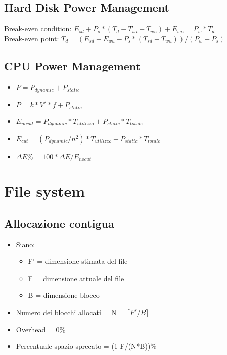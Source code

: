 \documentclass[10pt]{article}
\begin{document}
\subsection*{Hard Disk Power Management}
Break-even condition: $E_{sd}+P_s*(T_d-T_{sd}-T_{wu})+E_{wu}=P_w*T_d$\\
Break-even point: $T_d=(E_{sd}+E_{wu}-P_s*(T_{sd}+T_{wu}))/(P_w-P_s)$
\subsection*{CPU Power Management}
\begin{itemize}
    \item $P=P_{dynamic}+P_{static}$
    \item $P=k*V^2*f+P_{static}$
    \item $E_{nocut}=P_{dynamic}*T_{utilizzo}+P_{static}*T_{totale}$
    \item $E_{cut}=(P_{dynamic}/n^2)*T_{utilizzo}+P_{static}*T_{totale}$
    \item $\Delta E\%=100*\Delta E/E_{nocut}$
\end{itemize}
\section{File system}
\subsection*{Allocazione contigua}
\begin{itemize}
    \item Siano:
    \begin{itemize}
        \item F' = dimensione stimata del file
        \item F = dimensione attuale del file
        \item B = dimensione blocco
    \end{itemize}
    \item Numero dei blocchi allocati = N = $\lceil F'/B \rceil$
    \item Overhead = 0\%
    \item Percentuale spazio sprecato = (1-F/(N*B))\%
\end{itemize}
\end{document}
